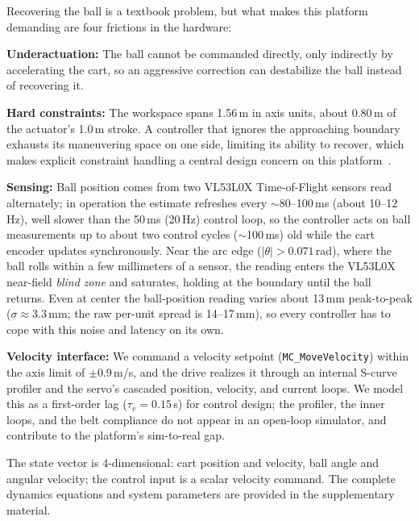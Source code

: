 Recovering the ball is a textbook problem, but what makes this platform demanding are four frictions in the hardware:

\noindent\textbf{Underactuation:} The ball cannot be commanded directly, only indirectly by accelerating the cart, so an aggressive correction can destabilize the ball instead of recovering it.

\noindent\textbf{Hard constraints:} The workspace spans 1.56\,m in axis units, about 0.80\,m of the actuator's 1.0\,m stroke.
A controller that ignores the approaching boundary exhausts its maneuvering space on one side, limiting its ability to recover, which makes explicit constraint handling a central design concern on this platform~\cite{brunke2022safe}.

\noindent\textbf{Sensing:} Ball position comes from two VL53L0X Time-of-Flight sensors read alternately; in operation the estimate refreshes every ${\sim}$80--100\,ms (about 10--12\,Hz), well slower than the 50\,ms (20\,Hz) control loop, so the controller acts on ball measurements up to about two control cycles (${\sim}$100\,ms) old while the cart encoder updates synchronously.
Near the arc edge ($|\theta| > 0.071$\,rad), where the ball rolls within a few millimeters of a sensor, the reading enters the VL53L0X near-field \emph{blind zone} and saturates, holding at the boundary until the ball returns.
Even at center the ball-position reading varies about 13\,mm peak-to-peak ($\sigma \approx 3.3$\,mm; the raw per-unit spread is 14--17\,mm), so every controller has to cope with this noise and latency on its own.

\noindent\textbf{Velocity interface:} We command a velocity setpoint (\texttt{MC\_MoveVelocity}) within the axis limit of $\pm$0.9\,m/s, and the drive realizes it through an internal S-curve profiler and the servo's cascaded position, velocity, and current loops.
We model this as a first-order lag ($\tau_v = 0.15$\,s) for control design; the profiler, the inner loops, and the belt compliance do not appear in an open-loop simulator, and contribute to the platform's sim-to-real gap.

The state vector is 4-dimensional: cart position and velocity, ball angle and angular velocity; the control input is a scalar velocity command.
The complete dynamics equations and system parameters are provided in the supplementary material.
